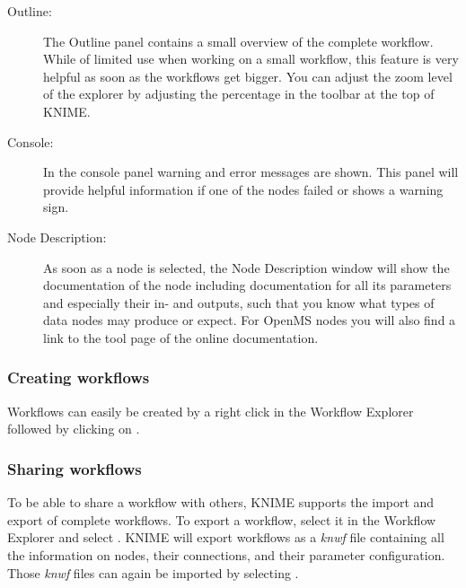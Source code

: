 \begin{description}
\item[Outline:]
The Outline panel contains a small overview of the complete workflow. While of limited use when working on a small 
workflow, this feature is very helpful as soon as the workflows get bigger. You can adjust the zoom level of the 
explorer by adjusting the percentage in the toolbar at the top of KNIME.

\item[Console:]
In the console panel warning and error messages are shown.
This panel will provide helpful information if one of the nodes failed or shows a warning sign.

\item[Node Description:]
As soon as a node is selected, the Node Description window will show the documentation of the node including 
documentation for all its parameters and especially their in- and outputs, such that you know what types of data 
nodes may produce or expect.
For OpenMS nodes you will also find a link to the tool page of the online documentation.

\end{description}

\subsubsection{Creating workflows}
\label{sec:create_workflows}

Workflows can easily be created by a right click in the Workflow Explorer followed by clicking on .

\subsubsection{Sharing workflows}
\label{sec:sharing_workflows}

To be able to share a workflow with others, KNIME supports the import and export of complete workflows.
To export a workflow, select it in the Workflow Explorer and select .
KNIME will export workflows as a \textit{knwf} file containing all the information on nodes, their connections, and their parameter configuration.
Those \textit{knwf} files can again be imported by selecting .


